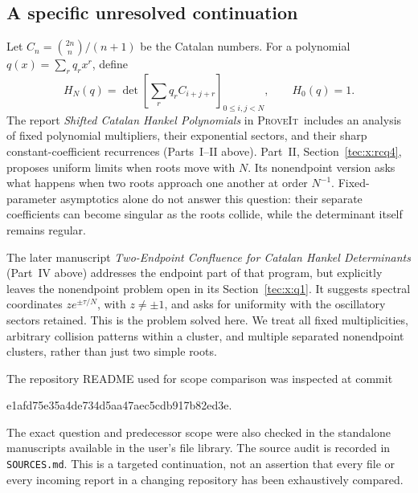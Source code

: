 \documentclass[11pt,a4paper]{article}
\numberwithin{equation}{section}
\theoremstyle{definition}
\theoremstyle{remark}
\begin{document}
\subsection{A specific unresolved continuation}
Let $C_n=\binom{2n}{n}/(n+1)$ be the Catalan numbers. For a polynomial
$q(x)=\sum_r q_rx^r$, define
\begin{equation}\label{ic:eq:Hdef}
 H_N(q)=\det\left[\sum_r q_r C_{i+j+r}\right]_{0\le i,j<N},
 \qquad H_0(q)=1.
\end{equation}
The report \textit{Shifted Catalan Hankel Polynomials} in \textsc{ProveIt}\ includes
an analysis of fixed polynomial multipliers, their exponential sectors,
and their sharp constant-coefficient recurrences (Parts~I--II above).
Part~II, Section~\ref{tec:x:rcq4}, proposes uniform limits when roots move with $N$.
Its nonendpoint version asks what happens when two roots approach one
another at order $N^{-1}$. Fixed-parameter asymptotics alone do not answer
this question: their separate coefficients can become singular as the
roots collide, while the determinant itself remains regular.

The later manuscript \textit{Two-Endpoint Confluence for Catalan Hankel
Determinants} (Part~IV above) addresses the endpoint part of that program, but explicitly
leaves the nonendpoint problem open in its Section~\ref{tec:x:q1}.
It suggests spectral coordinates $ze^{\pm\tau/N}$, with $z\ne\pm1$, and
asks for uniformity with the oscillatory sectors retained. This is the
problem solved here. We treat all fixed multiplicities, arbitrary
collision patterns within a cluster, and multiple separated nonendpoint
clusters, rather than just two simple roots.

The repository README used for scope comparison was inspected at commit
\begin{center}\small\ttfamily
 e1afd75e35a4de734d5aa47aec5cdb917b82ed3e.
\end{center}
The exact question and predecessor scope were also checked in the
standalone manuscripts available in the user's file library. The source
audit is recorded in \texttt{SOURCES.md}. This is a targeted continuation,
not an assertion that every file or every incoming report in a changing
repository has been exhaustively compared.

\end{document}
